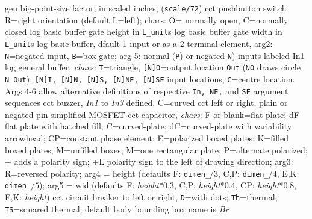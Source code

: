   {gen}
  {big-point-size factor, in scaled inches, ({\tt *scale/72})}
  {cct}
  {pushbutton switch R=right orientation (default L=left);
     chars: O= normally open, C=normally closed }
  {log}
  {basic buffer gate height in {\tt L\_unit}s}
  {log}
  {basic buffer gate width in {\tt L\_unit}s}
  {log}
  {basic buffer, dfault 1 input or as a 2-terminal element,
    arg2: {\tt N}=negated input, {\tt B}=box gate; arg 5:
    normal ({\tt P}) or negated {\tt N}) inputs labeled In1 
    }
  {log}
  {general buffer, {\sl chars:} {\tt T}=triangle,
            {\tt [N]O}=output location {\tt Out}
            ({\tt NO} draws circle {\tt N\_Out});
            {\tt [N]I, [N]N, [N]S, [N]NE, [N]SE}
            input locations; {\tt C}=centre location.
            Args 4-6 allow alternative
            definitions of respective {\tt In, NE,}
            and {\tt SE} argument sequences }
  {cct}
  {buzzer, {\sl In1} to {\sl In3} defined, C=curved
   }
%
  {cct}
  {left or right, plain or negated pin simplified MOSFET}
  {cct}
  {capacitor, {\sl chars}:
    F or blank=flat plate;
    dF flat plate with hatched fill;
    C=curved-plate;
    dC=curved-plate with variability arrowhead;
    CP=constant phase element;
    E=polarized boxed plates;
    K=filled boxed plates;
    M=unfilled boxes;
    M=one rectangular plate;
    P=alternate polarized;
    + adds a polarity sign;
    +L polarity sign to the left of drawing direction;
    arg3:  R=reversed polarity;
    arg4 = height (defaults F: {\tt dimen\_}$/3$,
      C,P: {\tt dimen\_}$/4$, E,K: {\tt dimen\_}$/5$);
    arg5 = wid (defaults F: {\sl height}*0.3,
      C,P: {\sl height}*0.4, CP: {\sl height}*0.8, E,K: {\sl height})
    }
  {cct}
  {circuit breaker to left or right, {\tt D}=with dots; {\tt Th}=thermal;
   {\tt TS}=squared thermal; default body bounding box name is
     {\sl Br}}
